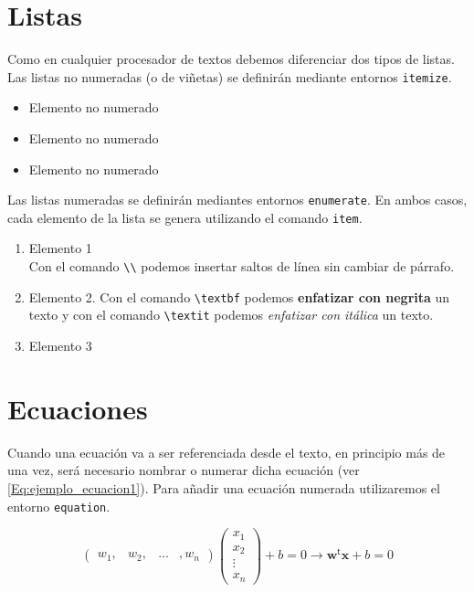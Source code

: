 \section{Listas}
Como en cualquier procesador de textos debemos diferenciar dos tipos de listas. Las listas no numeradas (o de viñetas) se definirán mediante entornos \verb|itemize|. 

\begin{itemize}
    \item Elemento no numerado
    \item Elemento no numerado 
    \item Elemento no numerado
\end{itemize}

Las listas numeradas se definirán mediantes entornos \verb|enumerate|. En ambos casos, cada elemento de la lista se genera utilizando el comando \verb|item|. 

\begin{enumerate}
    \item Elemento 1 \\ Con el comando \verb|\\| podemos insertar saltos de línea sin cambiar de párrafo.
    \item Elemento 2. Con el comando \verb|\textbf| podemos \textbf{enfatizar con negrita} un texto y con el comando \verb|\textit| podemos \textit{enfatizar con itálica} un texto.
    \item Elemento 3
\end{enumerate}

\section{Ecuaciones}
Cuando una ecuación va a ser referenciada desde el texto, en principio más de una vez, será necesario nombrar o numerar dicha ecuación (ver \autoref{Eq:ejemplo_ecuacion1}). Para añadir una ecuación numerada utilizaremos el entorno \verb|equation|.

\begin{equation}\label{Eq:ejemplo_ecuacion1}
\left(\begin{array}{cccc}w_{1}, & w_{2}, & ... & ,w_{n}\end{array}\right)
\left(\begin{array}{c}x_{1}\\x_{2}\\\vdots\\x_{n}\end{array}\right)+b=0
\rightarrow\mathbf{w^{\mathsf{t}}}\mathbf{x}+b=0
\end{equation}

